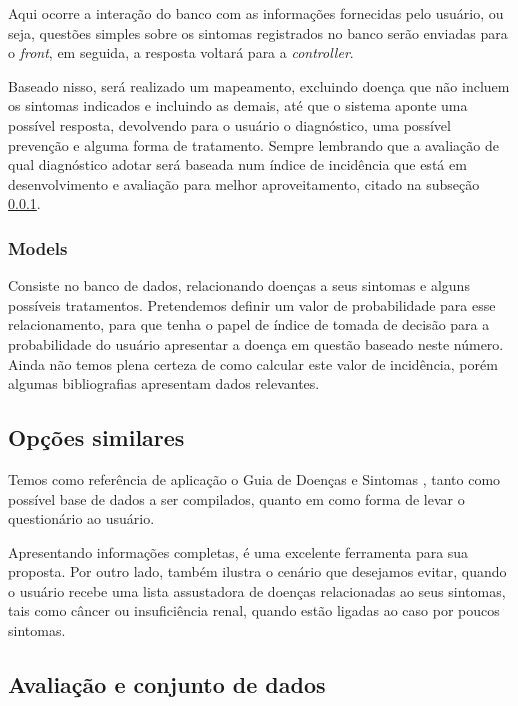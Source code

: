 Aqui ocorre a interação do banco com as informações fornecidas pelo usuário, ou seja, questões simples sobre os sintomas registrados no banco serão enviadas para o \emph{front}, em seguida, a resposta voltará para a \emph{controller}.

Baseado nisso, será realizado um mapeamento, excluindo doença que não incluem os sintomas indicados e incluindo as demais, até que o sistema aponte uma possível resposta, devolvendo para o usuário o diagnóstico, uma possível prevenção e alguma forma de tratamento.
Sempre lembrando que a avaliação de qual diagnóstico adotar será baseada num índice de incidência que está em desenvolvimento e avaliação para melhor aproveitamento, citado na subseção \ref{ssec:models}.

\subsubsection{Models}\label{ssec:models}

Consiste no banco de dados, relacionando doenças a seus sintomas e alguns possíveis tratamentos.
Pretendemos definir um valor de probabilidade para esse relacionamento, para que tenha o papel de índice de tomada de decisão para a probabilidade do usuário apresentar a doença em questão baseado neste número.
Ainda não temos plena certeza de como calcular este valor de incidência, porém algumas bibliografias apresentam dados relevantes\cite{AlbertEinstein, longo2011harrison}.

\subsection{Opções similares}

Temos como referência de aplicação o Guia de Doenças e Sintomas \cite{AlbertEinstein}, tanto como possível base de dados a ser compilados, quanto em como forma de levar o questionário ao usuário.

Apresentando informações completas, é uma excelente ferramenta para sua proposta.
Por outro lado, também ilustra o cenário que desejamos evitar, quando o usuário recebe uma lista assustadora de doenças relacionadas ao seus sintomas, tais como câncer ou insuficiência renal, quando estão ligadas ao caso por poucos sintomas.

\subsection{Avaliação e conjunto de dados}

